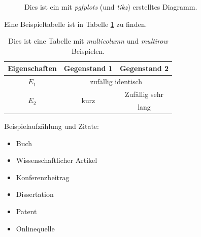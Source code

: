 \begin{figure}[!htbp]
	\centering
	\caption{Dies ist ein mit \textit{pgfplots} (und \textit{tikz}) erstelltes Diagramm.}
\label{fig:TestPgf}
\end{figure}


Eine Beispieltabelle ist in Tabelle \ref{tab:Test} zu finden.

\begin{table}[!htbp]
	\caption{Dies ist eine Tabelle mit \textit{multicolumn} und \textit{multirow} Beispielen.}
	\label{tab:Test}
	\centering
	\begin{tabular}{|c|c|c|}
		\hline
		\textbf{Eigenschaften} & \textbf{Gegenstand 1} & \textbf{Gegenstand 2}\\
		\hline
		$E_1$ & \multicolumn{2}{c|}{zufällig identisch}\\
		\hline
		\multirow{2}{*}{$E_2$} & \multirow{2}{*}{kurz} & Zufällig sehr\\
		 & & lang\\
		\hline
	\end{tabular}
\end{table}


Beispielaufzählung und Zitate:

\begin{itemize}
	\item Buch \cite{2016-Book-Kroll-CIA}
	\item Wissenschaftlicher Artikel \cite{OrdonezMueller2017}
	\item Konferenzbeitrag \cite{Schramm2019}
	\item Dissertation \cite{OrdonezMueller2018}
	\item Patent \cite{DPatent2017}
	\item Onlinequelle \cite{MRTToolbox2020}
\end{itemize}

